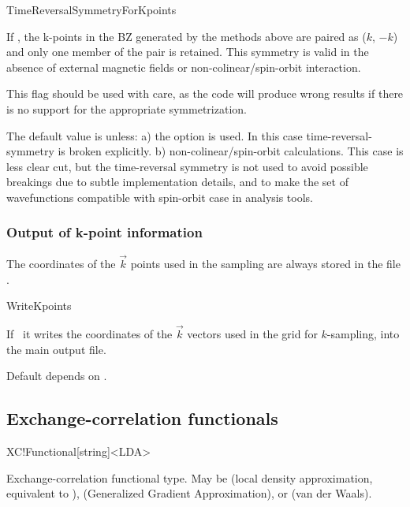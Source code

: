 \begin{fdflogicalT}{TimeReversalSymmetryForKpoints}

If \fdftrue, the k-points in the BZ generated by the methods above
are paired as ($k$, $-k$) and only one member of the pair is retained. This
symmetry is valid in the absence of external magnetic fields or
non-colinear/spin-orbit interaction.

This flag should be used with care, as the code will produce wrong
results if there is no support for the appropriate symmetrization.

The default value is \fdftrue unless: a) the option 
is used. In this case time-reversal-symmetry is broken explicitly. b)
non-colinear/spin-orbit calculations. This case is less clear cut, but
the time-reversal symmetry is not used to avoid possible breakings due
to subtle implementation details, and to make the set of wavefunctions
compatible with spin-orbit case in analysis tools.


\end{fdflogicalT}


\subsubsection{Output of k-point information}

The coordinates of the $\vec k$ points used in the sampling
are always stored in the file .

\begin{fdflogicalF}{WriteKpoints}
  
  If \fdftrue\ it writes the coordinates of the $\vec k$ vectors used
  in the grid for $k$-sampling, into the main output file.
  
  Default depends on .

\end{fdflogicalF}



\subsection{Exchange-correlation functionals}


\begin{fdfentry}{XC!Functional}[string]<LDA>
  
  Exchange-correlation functional type. May be  (local
  density approximation, equivalent to ), 
  (Generalized Gradient Approximation), or  (van der
  Waals).

\end{fdfentry}

